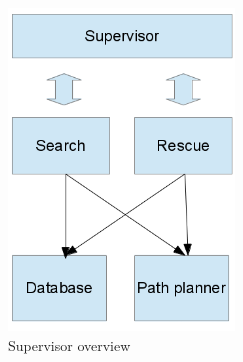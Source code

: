 \begin{figure}[h]
	\centering
		\includegraphics[width=6cm]{supervisor}
	\caption{Supervisor overview}
	\label{fig:supervisor}
\end{figure}
